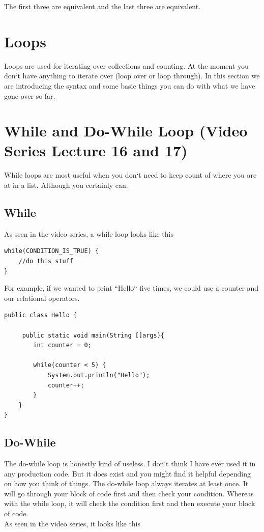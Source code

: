 \documentclass[11]{article}
\begin{document}
The first three are equivalent and the last three are equivalent.
\section{Loops}
Loops are used for iterating over collections and counting. At the moment you don`t have anything to iterate over (loop over or loop through). In this section we are introducing the syntax and some basic things you can do with what we have gone over so far.
\section{While and Do-While Loop (Video Series Lecture 16 and 17)}
While loops are most useful when you don`t need to keep count of where you are at in a list. Although you certainly can.
\subsection{While}
As seen in the video series, a while loop looks like this
\begin{lstlisting}
while(CONDITION_IS_TRUE) {
	//do this stuff
}
\end{lstlisting}

For example, if we wanted to print ``Hello`` five times, we could use a  counter and our relational operators.
\begin{lstlisting}
public class Hello {

     public static void main(String []args){
        int counter = 0;
        
        while(counter < 5) {
            System.out.println("Hello");
            counter++;
        }
    }
}
\end{lstlisting}

\subsection{Do-While}
The do-while loop is honestly kind of useless. I don`t think I have ever used it in any production code. But it does exist and you might find it helpful depending on how you think of things. The do-while loop always iterates at least once. It will go through your block of code first and then check your condition. Whereas with the while loop, it will check the condition first and then execute your block of code.\\

As seen in the video series, it looks like this
\end{document}
